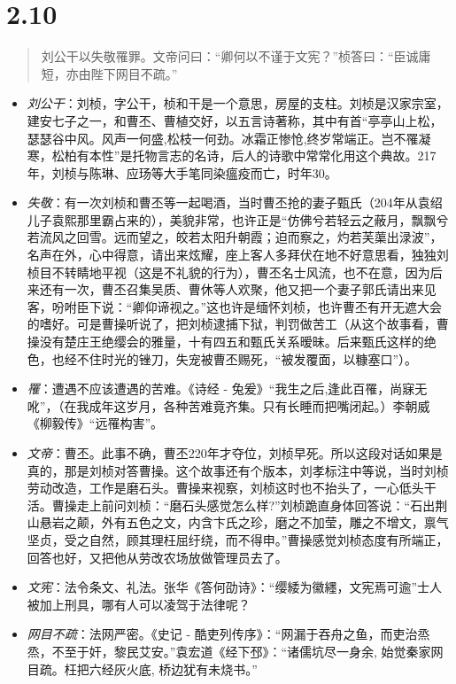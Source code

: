 \documentclass[]{book}
\providecommand{\tightlist}{%
  \setlength{\itemsep}{0pt}\setlength{\parskip}{0pt}}
\begin{document}
\section{2.10}\label{section-56}

\begin{quote}
刘公干以失敬罹罪。文帝问曰：``卿何以不谨于文宪？''桢答曰：``臣诚庸短，亦由陛下网目不疏。''
\end{quote}

\begin{itemize}
\tightlist
\item
  \emph{刘公干}：刘桢，字公干，桢和干是一个意思，房屋的支柱。刘桢是汉家宗室，建安七子之一，和曹丕、曹植交好，以五言诗著称，其中有首``亭亭山上松，瑟瑟谷中风。风声一何盛,松枝一何劲。冰霜正惨怆,终岁常端正。岂不罹凝寒，松柏有本性''是托物言志的名诗，后人的诗歌中常常化用这个典故。217年，刘桢与陈琳、应玚等大手笔同染瘟疫而亡，时年30。
\item
  \emph{失敬}：有一次刘桢和曹丕等一起喝酒，当时曹丕抢的妻子甄氏（204年从袁绍儿子袁熙那里霸占来的），美貌非常，也许正是``仿佛兮若轻云之蔽月，飘飘兮若流风之回雪。远而望之，皎若太阳升朝霞；迫而察之，灼若芙蕖出渌波''，名声在外，心中得意，请出来炫耀，座上客人多拜伏在地不好意思看，独独刘桢目不转睛地平视（这是不礼貌的行为），曹丕名士风流，也不在意，因为后来还有一次，曹丕召集吴质、曹休等人欢聚，他又把一个妻子郭氏请出来见客，吩咐臣下说：``卿仰谛视之。''这也许是缅怀刘桢，也许曹丕有开无遮大会的嗜好。可是曹操听说了，把刘桢逮捕下狱，判罚做苦工（从这个故事看，曹操没有楚庄王绝缨会的雅量，十有四五和甄氏关系暧昧。后来甄氏这样的绝色，也经不住时光的锉刀，失宠被曹丕赐死，``被发覆面，以糠塞口''）。
\item
  \emph{罹}：遭遇不应该遭遇的苦难。《诗经 -
  兔爰》``我生之后,逢此百罹，尚寐无吪''，（在我成年这岁月，各种苦难竟齐集。只有长睡而把嘴闭起。）李朝威《柳毅传》``远罹构害''。
\item
  \emph{文帝}：曹丕。此事不确，曹丕220年才夺位，刘桢早死。所以这段对话如果是真的，那是刘桢对答曹操。这个故事还有个版本，刘孝标注中等说，当时刘桢劳动改造，工作是磨石头。曹操来视察，刘桢这时也不抬头了，一心低头干活。曹操走上前问刘桢：``磨石头感觉怎么样?''刘桢跪直身体回答说：``石出荆山悬岩之颠，外有五色之文，内含卞氏之珍，磨之不加莹，雕之不增文，禀气坚贞，受之自然，顾其理枉屈纡绕，而不得申。''曹操感觉刘桢态度有所端正，回答也好，又把他从劳改农场放做管理员去了。
\item
  \emph{文宪}：法令条文、礼法。张华《答何劭诗》：``缨緌为徽纆，文宪焉可逾''士人被加上刑具，哪有人可以凌驾于法律呢？
\item
  \emph{网目不疏}：法网严密。《史记 -
  酷吏列传序》：``网漏于吞舟之鱼，而吏治烝烝，不至于奸，黎民艾安。''袁宏道《经下邳》：``诸儒坑尽一身余,
  始觉秦家网目疏。枉把六经灰火底, 桥边犹有未烧书。''
\end{itemize}
\end{document}
